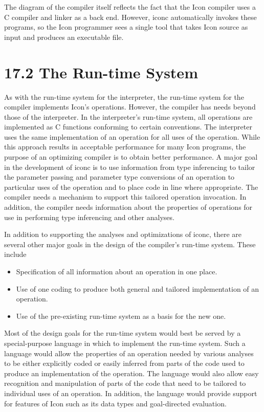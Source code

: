 The diagram of the compiler itself reflects the fact that the Icon
compiler uses a C compiler and linker as a back end.  However, iconc
automatically invokes these programs, so the Icon programmer sees a
single tool that takes Icon source as input and produces an executable
file.


\section[17.2 The Run-time System]{17.2 The Run-time System}

As with the run-time system for the interpreter, the run-time system
for the compiler implements Icon's operations.  However, the compiler
has needs beyond those of the interpreter. In the interpreter's
run-time system, all operations are implemented as C functions
conforming to certain conventions. The interpreter uses the same
implementation of an operation for all uses of the operation. While
this approach results in acceptable performance for many Icon
programs, the purpose of an optimizing compiler is to obtain better
performance. A major goal in the development of iconc is to use
information from type inferencing to tailor the parameter passing and
parameter type conversions of an operation to particular uses of the
operation and to place code in line where appropriate. The compiler
needs a mechanism to support this tailored operation invocation. In
addition, the compiler needs information about the properties of
operations for use in performing type inferencing and other analyses.

In addition to supporting the analyses and optimizations of iconc,
there are several other major goals in the design of the compiler's
run-time system. These include

\liststyleLxx
\begin{itemize}

\item Specification of all information about an operation in one place. 

\item Use of one coding to produce both general and tailored
implementation of an operation.

\item Use of the pre-existing run-time system as a basis for the new one. 

\end{itemize}

Most of the design goals for the run-time system would best be served
by a special-purpose language in which to implement the run-time
system. Such a language would allow the properties of an operation
needed by various analyses to be either explicitly coded or easily
inferred from parts of the code used to produce an implementation of
the operation. The language would also allow easy recognition and
manipulation of parts of the code that need to be tailored to
individual uses of an operation. In addition, the language would
provide support for features of Icon such as its data types and
goal-directed evaluation.

